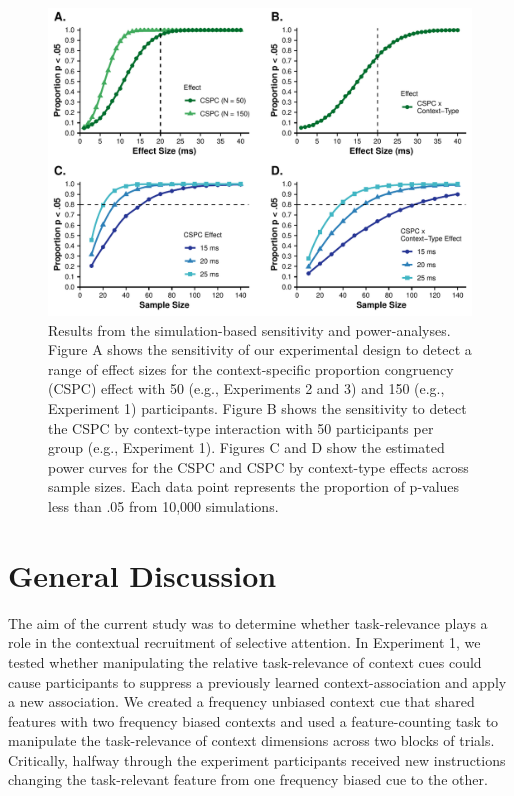 \documentclass[english,,man,floatsintext]{apa6}
\begin{document}
\begin{figure}[!h]
\includegraphics[width=\textwidth]{manuscript_files/figure-latex/figure5-1} \caption{Results from the simulation-based sensitivity and power-analyses. Figure A shows the sensitivity of our experimental design to detect a range of effect sizes for the context-specific proportion congruency (CSPC) effect with 50 (e.g., Experiments 2 and 3) and 150 (e.g., Experiment 1) participants. Figure B shows the sensitivity to detect the CSPC by context-type interaction with 50 participants per group (e.g., Experiment 1). Figures C and D show the estimated power curves for the CSPC and CSPC by context-type effects across sample sizes. Each data point represents the proportion of p-values less than .05 from 10,000 simulations.}\label{fig:figure5}
\end{figure}



\hypertarget{general-discussion}{%
\section{General Discussion}\label{general-discussion}}

The aim of the current study was to determine whether task-relevance plays a role in the contextual recruitment of selective attention. In Experiment 1, we tested whether manipulating the relative task-relevance of context cues could cause participants to suppress a previously learned context-association and apply a new association. We created a frequency unbiased context cue that shared features with two frequency biased contexts and used a feature-counting task to manipulate the task-relevance of context dimensions across two blocks of trials. Critically, halfway through the experiment participants received new instructions changing the task-relevant feature from one frequency biased cue to the other.
\end{document}
